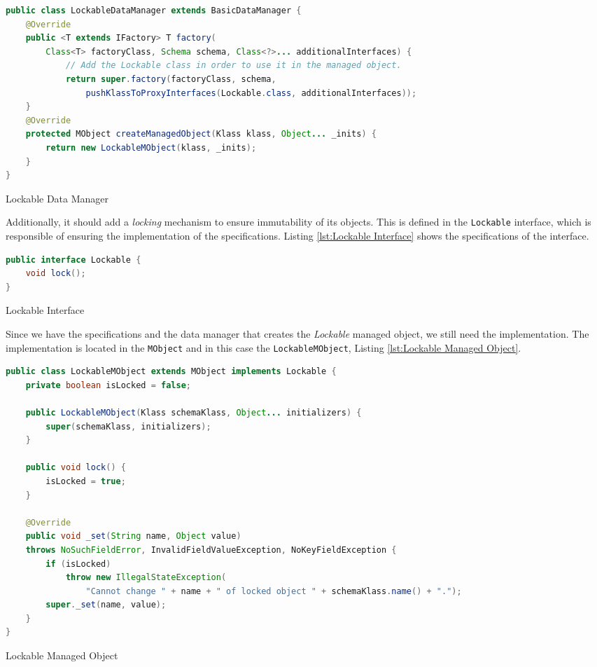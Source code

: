 \begin{sourcecode} [H]
	\begin{lstlisting}[language=Java, escapechar=|]
public class LockableDataManager extends BasicDataManager {
	@Override
	public <T extends IFactory> T factory(
		Class<T> factoryClass, Schema schema, Class<?>... additionalInterfaces) {
			// Add the Lockable class in order to use it in the managed object.
			return super.factory(factoryClass, schema, 
				pushKlassToProxyInterfaces(Lockable.class, additionalInterfaces));
	}
	@Override
	protected MObject createManagedObject(Klass klass, Object... _inits) {
		return new LockableMObject(klass, _inits);
	}
}
	\end{lstlisting}
	\caption{Lockable Data Manager}
	\label{lst:Lockable Data Manager}
\end{sourcecode}

Additionally, it should add a \textit{locking} mechanism to ensure immutability of its objects.
This is defined in the \texttt{Lockable} interface, which is responsible of ensuring the implementation of the specifications. 
Listing \ref{lst:Lockable Interface} shows the specifications of the interface.

\begin{sourcecode} [H]
	\begin{lstlisting}[language=Java, escapechar=|]
public interface Lockable {
	void lock();
}
	\end{lstlisting}
	\caption{Lockable Interface}
	\label{lst:Lockable Interface}
\end{sourcecode}

Since we have the specifications and the data manager that creates the \textit{Lockable} managed object, we still need the implementation.
The implementation is located in the \texttt{MObject} and in this case the \texttt{LockableMObject}, 
Listing \ref{lst:Lockable Managed Object}.

\begin{sourcecode} [H]
	\begin{lstlisting}[language=Java, escapechar=|]
public class LockableMObject extends MObject implements Lockable {
	private boolean isLocked = false;

	public LockableMObject(Klass schemaKlass, Object... initializers) {
		super(schemaKlass, initializers);
	}

	public void lock() {
		isLocked = true;
	}

	@Override
	public void _set(String name, Object value) 
	throws NoSuchFieldError, InvalidFieldValueException, NoKeyFieldException {
		if (isLocked)
	    	throw new IllegalStateException(
	    		"Cannot change " + name + " of locked object " + schemaKlass.name() + ".");
		super._set(name, value);
	}
}
	\end{lstlisting}
	\caption{Lockable Managed Object}
	\label{lst:Lockable Managed Object}
\end{sourcecode}

